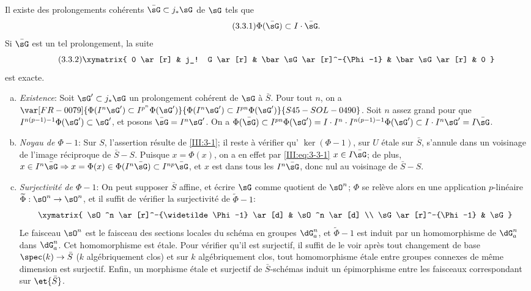 \begin{lemma_}\label{III:3-3}
Il existe des prolongements cohérents $\bar\sG\subset j_*\sG$ de $\sG$ tels 
que 
\begin{equation*}\tag{3.3.1}\label{III:eq:3-3-1}
  \Phi(\bar\sG)\subset I\cdot \bar\sG\text{.}
\end{equation*}
Si $\bar\sG$ est un tel prolongement, la suite 
\begin{equation*}\tag{3.3.2}\label{III:eq:3-3-2}
\xymatrix{
  0 \ar[r] 
    & j_! G \ar[r] 
    & \bar\sG \ar[r]^-{\Phi-1} 
    & \bar\sG \ar[r] 
    & 0
}
\end{equation*}
est exacte.
\end{lemma_}
\begin{enumerate}[a)]
  \item \emph{Existence}: Soit $\sG'\subset j_*\sG$ un prolongement cohérent 
    de $\sG$ à $\bar S$. Pour tout $n$, on a 
    $\var[FR-0079]{\Phi(I^n \sG')\subset I^{p^n}\Phi(\sG')}{\Phi(I^n \sG')\subset I^{p n}\Phi(\sG')}{S45-SOL-0490}$. Soit $n$ assez grand pour 
    que $I^{n(p-1)-1}\Phi(\sG')\subset \sG'$, et posons $\bar\sG=I^n\sG'$. 
    On a $\Phi(\bar\sG)\subset I^{p n}\Phi(\sG') 
    =I\cdot I^n\cdot I^{n(p-1)-1}\Phi(\sG')\subset I\cdot I^n\sG' 
    = I\bar\sG$. 
  \item {}\emph{Noyau de $\Phi-1$}: Sur $S$, l'assertion résulte de 
    \ref{III:3-1}; il reste à vérifier qu' 
    $\ker(\Phi-1)$, sur $U$ étale sur $\bar S$, s'annule dans un voisinage de 
    l'image réciproque de $\bar S-S$. Puisque $x=\Phi(x)$, on a en 
    effet par \eqref{III:eq:3-3-1} $x\in I\bar\sG$; de plus, 
    $x\in I^n\bar\sG\Rightarrow x=\Phi(x)\in\Phi(I^n\bar\sG)\subset I^{n p}\bar\sG$, et $x$ est dans tous les $I^n\bar\sG$, donc nul au voisinage de 
    $\bar S-S$.
  \item \emph{Surjectivité de $\Phi-1$}: On peut supposer $\bar S$ affine, et 
    écrire $\sG$ comme quotient de $\sO^n$; $\Phi$ se relève alors en une 
    application $p$-linéaire $\widetilde\Phi:\sO^n\to\sO^n$, et il suffit de 
    vérifier la surjectivité de $\widetilde\Phi-1$:
    \[\xymatrix{
      \sO^n \ar[r]^-{\widetilde \Phi-1} \ar[d] 
        & \sO^n \ar[d] \\
      \sG \ar[r]^-{\Phi-1} 
        & \sG 
    }\]
    Le faisceau $\sO^n$ est le faisceau des sections locales du schéma en 
    groupes $\dG_a^n$, et $\widetilde\Phi-1$ est induit par un homomorphisme de 
    $\dG_a^n$ dans $\dG_a^n$. Cet homomorphisme est étale. Pour vérifier 
    qu'il est surjectif, il suffit de le voir après tout changement de base 
    $\spec(k)\to\bar S$ ($k$ algébriquement clos) et sur $k$ algébriquement 
    clos, tout homomorphisme étale entre groupes connexes de même dimension 
    est surjectif. Enfin, un morphisme étale et surjectif de 
    $\bar S$-schémas induit un épimorphisme entre les faisceaux 
    correspondant sur $\et{\bar S}$.
\end{enumerate}





